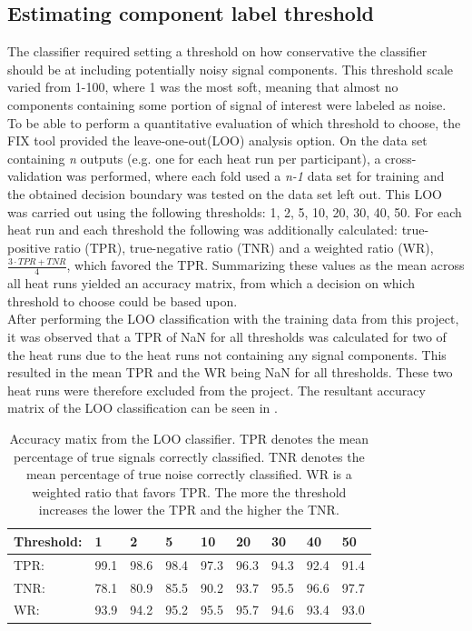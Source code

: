 \subsection{Estimating component label threshold}
The classifier required setting a threshold on how conservative the classifier should be at including potentially noisy signal components. This threshold scale varied from 1-100, where 1 was the most soft, meaning that almost no components containing some portion of signal of interest were labeled as noise. \\
To be able to perform a quantitative evaluation of which threshold to choose, the FIX tool provided the leave-one-out(LOO) analysis option. On the data set containing \textit{n} outputs (e.g. one for each heat run per participant), a cross-validation was performed, where each fold used a \textit{n-1} data set for training and the obtained decision boundary was tested on the data set left out. This LOO was carried out using the following thresholds: 1, 2, 5, 10, 20, 30, 40, 50. For each heat run and each threshold the following was additionally calculated: true-positive ratio (TPR), true-negative ratio (TNR) and a weighted ratio (WR), $\frac{3\cdot TPR+TNR}{4}$, which favored the TPR. Summarizing these values as the mean across all heat runs yielded an accuracy matrix, from which a decision on which threshold to choose could be based upon. \\
After performing the LOO classification with the training data from this project, it was observed that a TPR of NaN for all thresholds was calculated for two of the heat runs due to the heat runs not containing any signal components. This resulted in the mean TPR and the WR being NaN for all thresholds. These two heat runs were therefore excluded from the project. The resultant accuracy matrix of the LOO classification can be seen in .

\begin{table}[H] 
	\caption{Accuracy matix from the LOO classifier. TPR denotes the mean percentage of true signals correctly classified. TNR denotes the mean percentage of true noise correctly classified. WR is a weighted ratio that favors TPR. The more the threshold increases the lower the TPR and the higher the TNR.}\label{tab:decisionmatrix}
	\begin{tabular}{l|llllllll}
		Threshold:                              & 1    & 2    & 5    & 10   & 20   & 30   & 40   & 50   \\ \hline
		TPR:                                    & 99.1 & 98.6 & 98.4 & 97.3 & 96.3 & 94.3 & 92.4 & 91.4 \\ %
		TNR:                                    & 78.1 & 80.9 & 85.5 & 90.2 & 93.7 & 95.5 & 96.6 & 97.7 \\ %
		WR: & 93.9 & 94.2 & 95.2 & 95.5 & 95.7 & 94.6 & 93.4 & 93.0
	\end{tabular}
\end{table}


